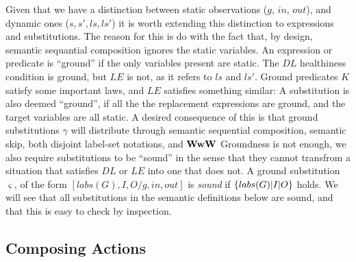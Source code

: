 Given that we have a distinction between static observations ($g$, $in$, $out$),
and dynamic ones ($s,s',ls,ls'$) it is worth extending this distinction
to expressions and substitutions.
The reason for this is do with the fact that, by design,
semantic sequantial composition ignores the static variables.
An expression or predicate is ``ground''
if the only variables present are static.
The $DL$ healthiness condition is ground,
but $LE$ is not, as it refers to $ls$ and $ls'$.
Ground predicates $K$ satisfy some important laws,
and $LE$ satisfies something similar:
 \noindent
A substitution is also deemed ``ground'',
if all the the replacement expressions are ground,
and the target variables are all static.
A desired consequence of this is that
ground substitutions $\gamma$
will distribute through semantic sequential composition,
semantic skip,
both disjoint label-set notations,
and $\mathbf{WwW}$
Groundness is not enough, we also require substitutions to be ``sound''
in the sense that they cannot transfrom a situation that satisfies $DL$
or $LE$ into one that does not.
A ground substitution $\varsigma$, of the form $[labs(G),I,O/g,in,out]$ is \emph{sound}
if $\{{labs(G)|I|O}\}$ holds.
We will see that all substitutions in the semantic definitions
below are sound, and that this is easy to check by inspection.


\subsection{Composing Actions}\label{ssec:composing}

